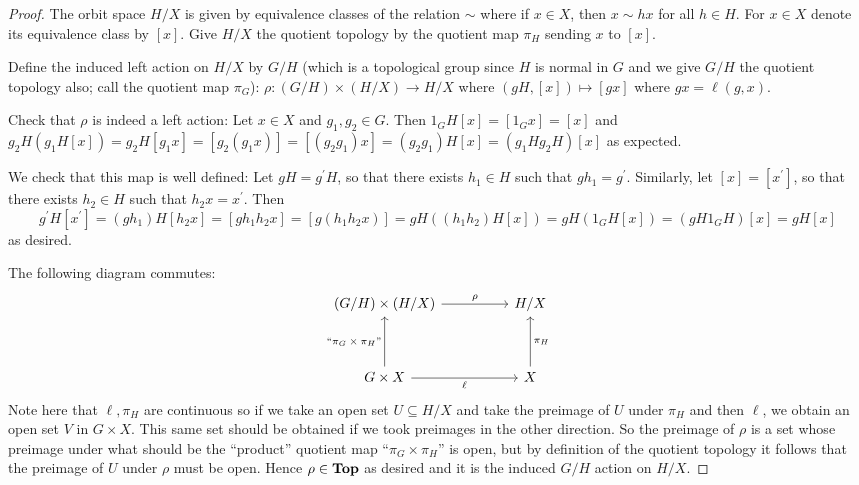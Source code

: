 \documentclass[11pt]{article}
\newcommand{\catname}[1]{{
  \textbf{#1}}}
\newcommand{\Top}{\catname{Top}}
\begin{document}
\begin{enumerate}
\begin{proof}
      The orbit space $H/X$ is given by equivalence classes of the relation $\sim$ where if $x\in X$, then $x\sim hx$ for all $h\in H$. For $x\in X$ denote its equivalence class by $[x]$. Give $H/X$ the quotient topology by the quotient map $\pi_H$ sending $x$ to $[x]$.

      Define the induced left action on $H/X$ by $G/H$ (which is a topological group since $H$ is normal in $G$ and we give $G/H$ the quotient topology also; call the quotient map $\pi_G$): $\rho\colon (G/H)\times (H/X)\to H/X $ where $(gH,[x])\mapsto [gx]$ where $gx = \ell(g,x)$.
      
      Check that $\rho$ is indeed a left action: Let $x\in X$ and $g_1,g_2\in G$. Then $1_GH[x] = [1_Gx] = [x]$ and $g_2H(g_1H[x]) = g_2H[g_1x] = [g_2(g_1x)] = [(g_2g_1)x] = (g_2g_1)H[x] = (g_1Hg_2H)[x]$ as expected.
      
      We check that this map is well defined: Let $gH = g^\prime H$, so that there exists $h_1\in H$ such that $gh_1 = g^\prime$. Similarly, let $[x] = [x^\prime]$, so that there exists $h_2\in H$ such that $h_2 x = x^\prime$. Then \[g^\prime H[x^\prime] = (gh_1)H[h_2 x] = [gh_1h_2 x] = [g(h_1h_2 x)] = gH((h_1h_2)H[x]) =  gH(1_GH[x]) = (gH1_GH)[x] = gH[x]\] as desired.

      The following diagram commutes: %
      \[\begin{tikzcd}
        {(G/H)\times(H/X)} && {H/X} \\
        \\
        {G\times X} && X
        \arrow["\ell"', from=3-1, to=3-3]
        \arrow["\rho", from=1-1, to=1-3]
        \arrow["{\pi_H}"', from=3-3, to=1-3]
        \arrow["{\text{``$\pi_G\times\pi_H$''}}", from=3-1, to=1-1]
      \end{tikzcd}\] Note here that $\ell, \pi_H$ are continuous so if we take an open set $U\subseteq H/X$ and take the preimage of $U$ under $\pi_H$ and then $\ell$, we obtain an open set $V$ in $G\times X$. This same set should be obtained if we took preimages in the other direction. So the preimage of $\rho$ is a set whose preimage under what should be the ``product'' quotient map ``$\pi_G\times\pi_H$'' is open, but by definition of the quotient topology it follows that the preimage of $U$ under $\rho$ must be open. Hence $\rho\in \Top$ as desired and it is the induced $G/H$ action on $H/X$.
    \end{proof}
\end{enumerate}
\end{document}

